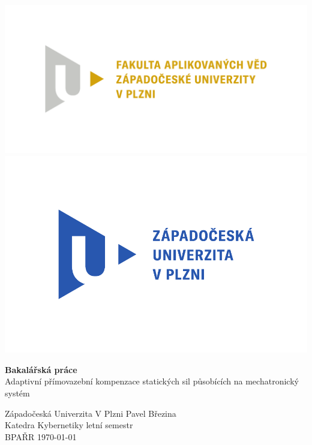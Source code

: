 \begin{center}
    \includegraphics[height=0.21\textheight]{Img/FAV_logo.pdf}
    \includegraphics[height=0.21\textheight]{Img/zcu-logo.pdf}
\end{center}
\begin{center}
    \vspace{3cm}
    \textbf{\LARGE{Bakalářská práce}}\\
    \Large{Adaptivní přímovazební kompenzace statických sil působících na mechatronický systém}
\end{center}
\vfill{}
\noindent
Západočeská Univerzita V Plzni \hfill Pavel Březina\\
Katedra Kybernetiky            \hfill letní semestr\\
BPAŘR             \hfill \today
\thispagestyle{empty}
\newpage